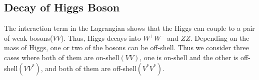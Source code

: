 
\newpage
\subsection{Decay of Higgs Boson}
The interaction term in the Lagrangian shows that the Higgs can 
couple to a pair of weak bosons($VV$). Thus, Higgs decays into $W^+W^-$ and $ZZ$.
Depending on the mass of Higgs, one or two of the bosons can be off-shell. 
Thus we consider three cases where both of them are on-shell$(VV)$, 
one is on-shell and the other is off-shell$(VV^*)$, 
and both of them are off-shell$(V^*V^*)$. 
